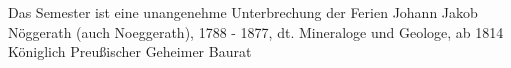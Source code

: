 {Das Semester ist eine unangenehme Unterbrechung der Ferien}
{Johann Jakob Nöggerath (auch Noeggerath), 1788 - 1877, dt. Mineraloge und Geologe, ab 1814 Königlich Preußischer Geheimer Baurat}





\vspace{3mm}
\vspace{3mm}
\newpage




